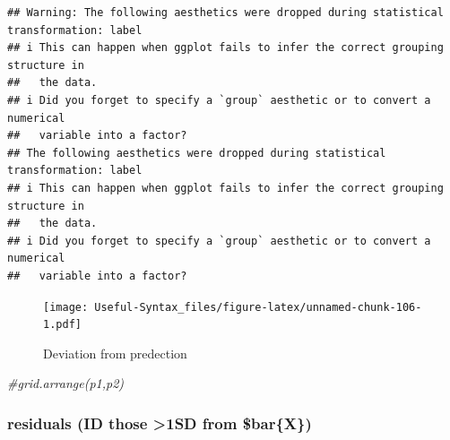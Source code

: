 \documentclass[
]{article}
\newenvironment{Shaded}{\begin{snugshade}}{\end{snugshade}}
\newcommand{\CommentTok}[1]{\textcolor[rgb]{0.56,0.35,0.01}{\textit{#1}}}
\begin{document}
\begin{verbatim}
## Warning: The following aesthetics were dropped during statistical transformation: label
## i This can happen when ggplot fails to infer the correct grouping structure in
##   the data.
## i Did you forget to specify a `group` aesthetic or to convert a numerical
##   variable into a factor?
## The following aesthetics were dropped during statistical transformation: label
## i This can happen when ggplot fails to infer the correct grouping structure in
##   the data.
## i Did you forget to specify a `group` aesthetic or to convert a numerical
##   variable into a factor?
\end{verbatim}

\begin{figure}
\centering
\texttt{[image: Useful-Syntax\_files/figure-latex/unnamed-chunk-106-1.pdf]}
\caption{\label{fig:unnamed-chunk-106}Deviation from predection}
\end{figure}

\begin{Shaded}
\begin{Highlighting}[]
\CommentTok{\#grid.arrange(p1,p2)}
\end{Highlighting}
\end{Shaded}

\hypertarget{residuals-id-those-1sd-from-barx}{%
\subsubsection{residuals (ID those \textgreater1SD from \$bar\{X\})}\label{residuals-id-those-1sd-from-barx}}
\end{document}
